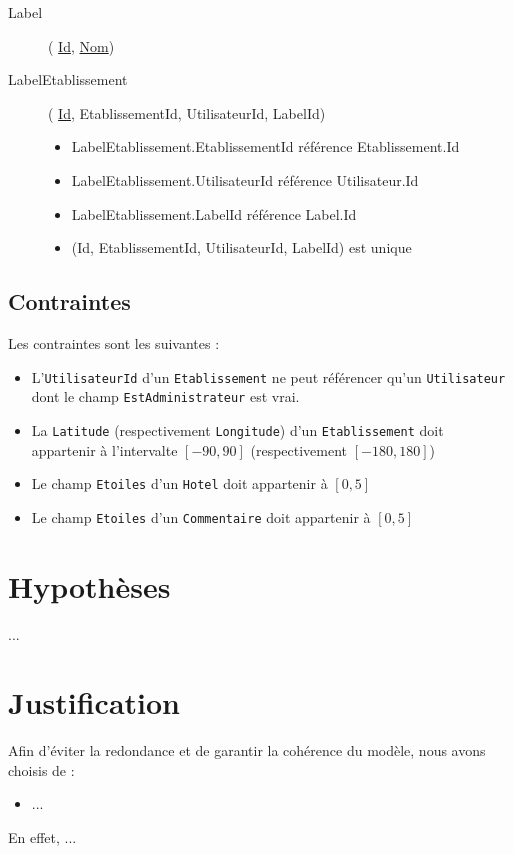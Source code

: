 \documentclass[10pt,a4paper]{article}
\begin{document}
\begin{description}
\item[Label](
    \underline{Id},
    \underline{Nom})

\item[LabelEtablissement](
    \underline{Id},
    EtablissementId,
    UtilisateurId,
    LabelId)

    \begin{itemize}
        \item LabelEtablissement.EtablissementId référence Etablissement.Id
        \item LabelEtablissement.UtilisateurId référence Utilisateur.Id
        \item LabelEtablissement.LabelId référence Label.Id
        \item (Id, EtablissementId, UtilisateurId, LabelId) est unique
    \end{itemize}

\end{description}

\subsection{Contraintes}

Les contraintes sont les suivantes :
\begin{itemize}
  \item L'\texttt{UtilisateurId} d'un \texttt{Etablissement} ne peut référencer qu'un \texttt{Utilisateur} dont le champ \texttt{EstAdministrateur} est vrai.
  \item La \texttt{Latitude} (respectivement \texttt{Longitude}) d'un \texttt{Etablissement} doit appartenir à l'intervalte $[-90, 90]$ (respectivement $[-180, 180]$)
  \item Le champ \texttt{Etoiles} d'un \texttt{Hotel} doit appartenir à $[0,5]$
  \item Le champ \texttt{Etoiles} d'un \texttt{Commentaire} doit appartenir à $[0,5]$
\end{itemize}

\section{Hypothèses}

...

\section{Justification}

Afin d'éviter la redondance et de garantir la cohérence du modèle, nous avons choisis de :
\begin{itemize}
  \item ...
\end{itemize}
En effet, ...
\end{document}
